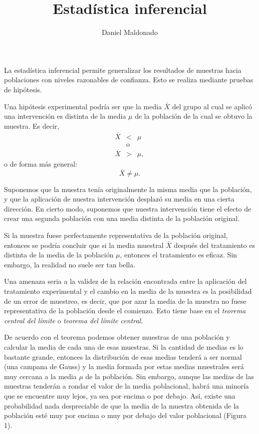 \documentclass[a4paper,12pt]{article}
\title{Estadística inferencial}
\author{Daniel Maldonado}
\date{}
\begin{document}
{\scshape\bfseries \maketitle}

La estadística inferencial permite generalizar los resultados de muestras hacia poblaciones con niveles razonables de confianza. Esto se realiza mediante pruebas de hipótesis.

Una hipótesis experimental podría ser que la media $\bar{X}$ del grupo al cual se aplicó una intervención es distinta de la media $\mu$ de la población de la cual se obtuvo la muestra. Es decir,
\begin{eqnarray*}
    \bar{X} &<& \mu\\
            &\mbox{o}&\\
    \bar{X} &>& \mu,
\end{eqnarray*}
o de forma más general:
\[
    \bar{X} \neq \mu
.\]

Suponemos que la muestra tenía originalmente la misma media que la población, y que la aplicación de nuestra intervención desplazó su media en una cierta dirección. En cierto modo, suponemos que nuestra intervención tiene el efecto de crear una segunda población con una media distinta de la población original.

Si la muestra fuese perfectamente representativa de la población original, entonces se podría concluir que si la media muestral $\bar{X}$ después del tratamiento es distinta de la media de la población $\mu$, entonces el tratamiento es eficaz. Sin embargo, la realidad no suele ser tan bella.

Una amenaza seria a la validez de la relación encontrada entre la aplicación del tratamiento experimental y el cambio en la media de la muestra es la posibilidad de un error de muestreo, es decir, que por azar la media de la muestra no fuese representativa de la población desde el comienzo. Esto tiene base en el {\slshape teorema central del límite} o {\slshape teorema del límite central}.

De acuerdo con el teorema podemos obtener muestras de una población y calcular la media de cada una de esas muestras. Si la cantidad de medias es lo bastante grande, entonces la distribución de esas medias tenderá a ser normal (una campana de Gauss) y la media formada por estas medias muestrales será muy cercana a la media $\mu$ de la población. Sin embargo, aunque las medias de las muestras tenderán a rondar el valor de la media poblacional, habrá una minoría que se encuentre muy lejos, ya sea por encima o por debajo. Así, existe una probabilidad nada despreciable de que la media de la muestra obtenida de la población esté muy por encima o muy por debajo del valor poblacional (Figura 1).
\end{document}
